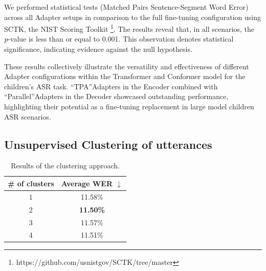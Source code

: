We performed statistical tests (Matched Pairs Sentence-Segment Word Error) across all Adapter setups in comparison to the full fine-tuning configuration using SCTK, the NIST Scoring Toolkit \footnote{https://github.com/usnistgov/SCTK/tree/master}. 
The results reveal that, in all scenarios, the \textit{p}-value is less than or equal to 0.001. This observation denotes statistical significance, indicating evidence against the null hypothesis. 

These results collectively illustrate the versatility and effectiveness of different Adapter configurations within the Transformer and  Conformer model for the children's ASR task. ``TPA''Adapters in the Encoder combined with ``Parallel''Adapters in the Decoder showcased outstanding performance, highlighting their potential as a fine-tuning replacement in large model children ASR scenarios.

\subsection{Unsupervised Clustering of utterances}
\begin{table}[t]
\caption{Results of the clustering approach.}
\begin{center}    
\begin{tabular}{cc}
\hline
  \# of clusters & Average WER $\downarrow$    \\ \hline
\multicolumn{1}{c}{1} & 11.58\%  \\%
\multicolumn{1}{c}{2} & \textbf{11.50\%}  \\
\multicolumn{1}{c}{3} & 11.57\%  \\
\multicolumn{1}{c}{4} & 11.51\%  \\ \hline 

\end{tabular}
\end{center}

\label{tab:res_clusters}
\end{table}

